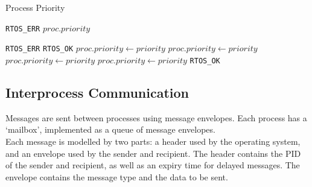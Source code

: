 \documentclass[12pt]{report}
\begin{document}
\begin{algorithm}
\caption{Process Priority}
\label{alg:processpriority}
\begin{algorithmic}[1]
        \State \Return \texttt{RTOS_ERR}
    \EndIf
    \State \Return $proc.priority$
\EndProcedure

\Statex

        \State \Return \texttt{RTOS_ERR}
    \EndIf
        \State \Return \texttt{RTOS_OK} 
    \EndIf
        \State {}
        \State $proc.priority \leftarrow priority$
        \State {}
        \State {}
        \State $proc.priority \leftarrow priority$
        \State {}
        \State {}
        \State $proc.priority \leftarrow priority$
        \State {}
    \Else
        \State $proc.priority \leftarrow priority$
    \EndIf
    \State {}
    \State \Return \texttt{RTOS_OK}
\EndProcedure
\end{algorithmic}
\end{algorithm}

\subsection{Interprocess Communication}

Messages are sent between processes using message envelopes. Each process has a `mailbox', implemented as a queue of message envelopes.\\

Each message is modelled by two parts: a header used by the operating system, and an envelope used by the sender and recipient. The header contains the PID of the sender and recipient, as well as an expiry time for delayed messages. The envelope contains the message type and the data to be sent.\\
\end{document}
